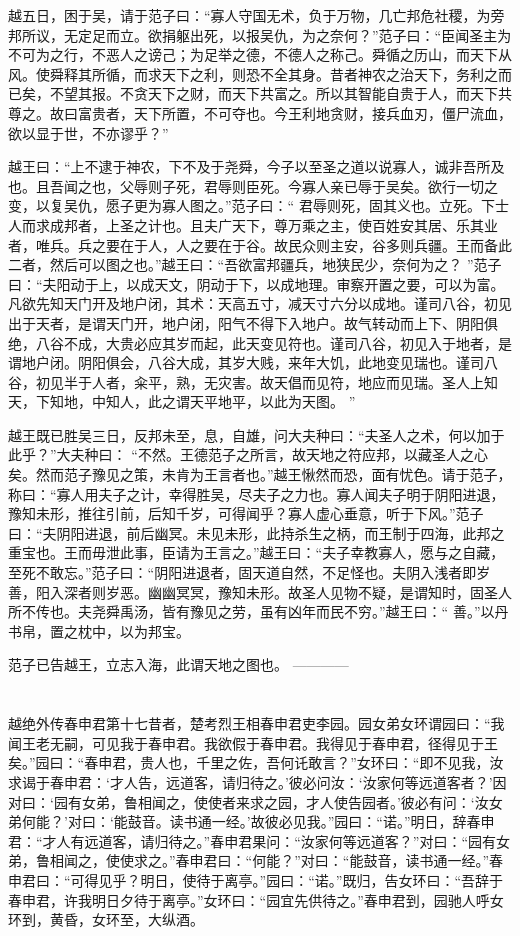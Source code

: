 \documentclass[12pt,UTF8]{ctexbook}
\begin{document}
越五日，困于吴，请于范子曰：“寡人守国无术，负于万物，几亡邦危社稷，为旁邦所议，无定足而立。欲捐躯出死，以报吴仇，为之奈何？”范子曰：“臣闻圣主为不可为之行，不恶人之谤己；为足举之德，不德人之称己。舜循之历山，而天下从风。使舜释其所循，而求天下之利，则恐不全其身。昔者神农之治天下，务利之而已矣，不望其报。不贪天下之财，而天下共富之。所以其智能自贵于人，而天下共尊之。故曰富贵者，天下所置，不可夺也。今王利地贪财，接兵血刃，僵尸流血，欲以显于世，不亦谬乎？”

越王曰：“上不逮于神农，下不及于尧舜，今子以至圣之道以说寡人，诚非吾所及也。且吾闻之也，父辱则子死，君辱则臣死。今寡人亲已辱于吴矣。欲行一切之变，以复吴仇，愿子更为寡人图之。”范子曰：“ 君辱则死，固其义也。立死。下士人而求成邦者，上圣之计也。且夫广天下，尊万乘之主，使百姓安其居、乐其业者，唯兵。兵之要在于人，人之要在于谷。故民众则主安，谷多则兵疆。王而备此二者，然后可以图之也。”越王曰：“吾欲富邦疆兵，地狭民少，奈何为之？ ”范子曰：“夫阳动于上，以成天文，阴动于下，以成地理。审察开置之要，可以为富。凡欲先知天门开及地户闭，其术：天高五寸，减天寸六分以成地。谨司八谷，初见出于天者，是谓天门开，地户闭，阳气不得下入地户。故气转动而上下、阴阳俱绝，八谷不成，大贵必应其岁而起，此天变见符也。谨司八谷，初见入于地者，是谓地户闭。阴阳俱会，八谷大成，其岁大贱，来年大饥，此地变见瑞也。谨司八谷，初见半于人者，籴平，熟，无灾害。故天倡而见符，地应而见瑞。圣人上知天，下知地，中知人，此之谓天平地平，以此为天图。 ”

越王既已胜吴三日，反邦未至，息，自雄，问大夫种曰：“夫圣人之术，何以加于此乎？”大夫种曰： “不然。王德范子之所言，故天地之符应邦，以藏圣人之心矣。然而范子豫见之策，未肯为王言者也。”越王愀然而恐，面有忧色。请于范子，称曰：“寡人用夫子之计，幸得胜吴，尽夫子之力也。寡人闻夫子明于阴阳进退，豫知未形，推往引前，后知千岁，可得闻乎？寡人虚心垂意，听于下风。”范子曰：“夫阴阳进退，前后幽冥。未见未形，此持杀生之柄，而王制于四海，此邦之重宝也。王而毋泄此事，臣请为王言之。”越王曰：“夫子幸教寡人，愿与之自藏，至死不敢忘。”范子曰：“阴阳进退者，固天道自然，不足怪也。夫阴入浅者即岁善，阳入深者则岁恶。幽幽冥冥，豫知未形。故圣人见物不疑，是谓知时，固圣人所不传也。夫尧舜禹汤，皆有豫见之劳，虽有凶年而民不穷。”越王曰：“ 善。”以丹书帛，置之枕中，以为邦宝。

范子已告越王，立志入海，此谓天地之图也。
------------

\part{}

越绝外传春申君第十七昔者，楚考烈王相春申君吏李园。园女弟女环谓园曰：“我闻王老无嗣，可见我于春申君。我欲假于春申君。我得见于春申君，径得见于王矣。”园曰：“春申君，贵人也，千里之佐，吾何讬敢言？”女环曰：“即不见我，汝求谒于春申君：‘才人告，远道客，请归待之。’彼必问汝：‘汝家何等远道客者？’因对曰：‘园有女弟，鲁相闻之，使使者来求之园，才人使告园者。’彼必有问：‘汝女弟何能？’对曰：‘能鼓音。读书通一经。’故彼必见我。”园曰：“诺。”明日，辞春申君：“才人有远道客，请归待之。”春申君果问：“汝家何等远道客？”对曰：“园有女弟，鲁相闻之，使使求之。”春申君曰：“何能？”对曰：“能鼓音，读书通一经。”春申君曰：“可得见乎？明日，使待于离亭。”园曰：“诺。”既归，告女环曰：“吾辞于春申君，许我明日夕待于离亭。”女环曰：“园宜先供待之。”春申君到，园驰人呼女环到，黄昏，女环至，大纵酒。
\end{document}
